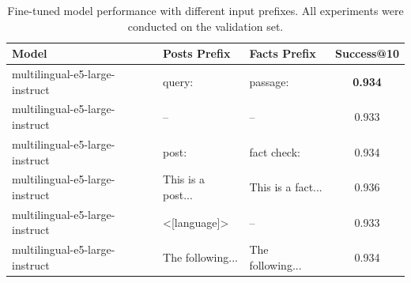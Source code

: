 \documentclass[11pt]{article}
\begin{document}
\begin{table}[t]
  \centering
  \small
  \begin{tabular}{p{4.5cm}p{2cm}p{2cm}c}
    \hline
    \textbf{Model} & \textbf{Posts Prefix} & \textbf{Facts Prefix} & \textbf{Success@10} \\
    \hline
    multilingual-e5-large-instruct & query: & passage: & \textbf{0.934} \\
    multilingual-e5-large-instruct & -- & -- & 0.933 \\
    multilingual-e5-large-instruct & post: & fact check: & 0.934 \\
    multilingual-e5-large-instruct & This is a post... & This is a fact... & 0.936 \\
    multilingual-e5-large-instruct & <[language]> & -- & 0.933 \\
    multilingual-e5-large-instruct & The following... & The following... & 0.934 \\
    \hline
  \end{tabular}
  \caption{Fine-tuned model performance with different input prefixes. All experiments were conducted on the validation set.}
  \label{tab:prefix-experiments}
\end{table}
\end{document}
